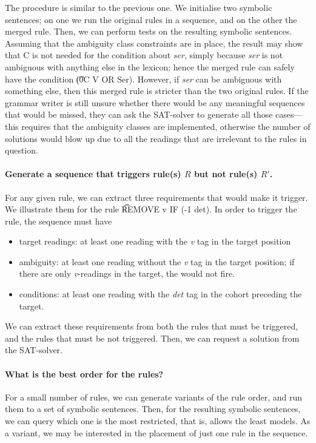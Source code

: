{{The procedure is similar to the previous one. We initialise two symbolic sentences; on one we run the original rules in a sequence, and on the other the merged rule.
Then, we can perform tests on the resulting symbolic sentences. Assuming that the ambiguity class constraints are in place, the result may show that C is not needed for the condition about {\em ser}, simply because {\em ser} is not ambiguous with anything else in the lexicon; hence the merged rule can safely have the condition \t{(0C V OR Ser)}. However, if {\em ser} can be ambiguous with something else, then this merged rule is stricter than the two original rules. If the grammar writer is still unsure whether there would be any meaningful sequences that would be missed, they can ask the SAT-solver to generate all those cases---this requires that the ambiguity classes are implemented,
otherwise the number of solutions would blow up due to all the readings that are irrelevant to the rules in question.

\paragraph{Generate a sequence that triggers rule(s) $R$ but not rule(s) $R'$.}
For any given rule, we can extract three requirements that would make it trigger. We illustrate them for the rule \t{REMOVE v IF (-1 det)}. In order to trigger the rule, the sequence must have
\begin{itemize}
\item target readings: at least one reading with the \emph{v} tag in the target position
\item ambiguity: at least one reading without the \emph{v} tag in the target position; if there are only \emph{v}-readings in the target, the would not fire.
\item conditions: at least one reading with the \emph{det} tag in the cohort preceding the target.
\end{itemize}

We can extract these requirements from both the rules that must be triggered, and the rules that must be not triggered. Then, we can request a solution from the SAT-solver.

\paragraph{What is the best order for the rules?}
For a small number of rules, we can generate variants of the rule order, and run them to a set of symbolic sentences. Then, for the resulting symbolic sentences, we can query which one is the most restricted, that is, allows the least models.
As a variant, we may be interested in the placement of just one rule in the sequence.

}}
